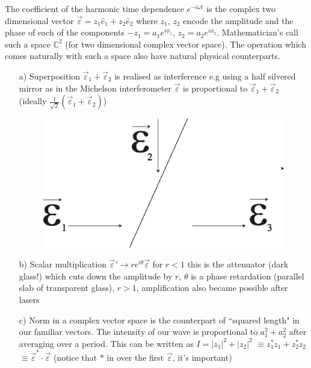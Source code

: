 The coefficient of the harmonic time dependence $e^{-i \omega t}$ is the complex two dimensional vector
$\overrightarrow{\varepsilon} = z_1 \hat{e}_1 + z_2 \hat{e}_2$ where $z_1$, $z_2$ encode the amplitude and the phase of each of
the components $- z_1 = a_1 e^{i \phi_1}$, $z_2 = a_2 e^{i\phi_2}$. Mathematician's call such a space
$\mathbb{C}^2$ (for two dimensional complex vector space). The operation which comes
naturally with such a space also have natural physical counterparts.
\begin{itemize}
\item[a)] Superposition $\overrightarrow{\varepsilon}_1 + \overrightarrow{\varepsilon}_2$ is realised as interference e.g using a half silvered
mirror as in the Michelson interferometer $\overrightarrow{\varepsilon}$ is proportional to $\overrightarrow{\varepsilon}_1 + \overrightarrow{\varepsilon}_2$ (ideally
$\frac{1}{\sqrt{2}} (\overrightarrow{\varepsilon}_1 + \overrightarrow{\varepsilon}_2)$)
\bigskip

\begin{figure}[H]
\centering
\includegraphics[scale=0.2]{src/images/chap26/1.jpg}
\end{figure}

\item[b)] Scalar multiplication $\overrightarrow{\varepsilon}' \to re^{i\theta} \overrightarrow{\varepsilon}$ for $r < 1$ this is the attenuator (dark
glass!) which cuts down the amplitude by $r$, $\theta$ is a phase retardation (parallel slab of transparent glass), $r > 1$, amplification also became possible after lasers


\item[c)] Norm in a complex vector space is the counterpart of ``squared length" in
our familiar vectors. The intensity of our wave is proportional to $a_1^2 + a_2^2$ after
averaging over a period. This can be written as $I = | z_1 |^2 + | z_2 |^2$ $\equiv z^{\ast}_1 z_1 + z^{\ast}_2 z_2$ $\equiv \overrightarrow{\varepsilon}^{\ast} \cdot \overrightarrow{\varepsilon}$ (notice that $\ast$ in over the first $\overrightarrow{\varepsilon}$, it's important)


\end{itemize}
